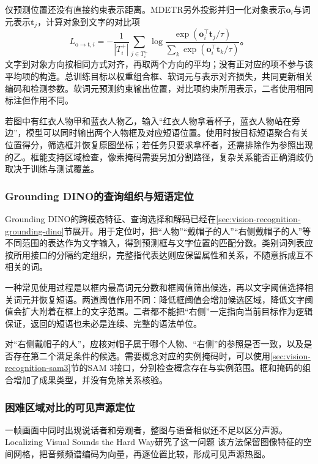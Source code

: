 仅预测位置还没有直接约束表示距离。MDETR另外投影并归一化对象表示$\bm o_i$与词元表示$\bm t_j$，计算对象到文字的对比项
\[
  L_{\mathrm{o\to t},i}
  =-\frac{1}{|T_i^+|}\sum_{j\in T_i^+}
    \log\frac{\exp(\bm o_i^\top\bm t_j/\tau)}
    {\sum_k\exp(\bm o_i^\top\bm t_k/\tau)}\text{。}
\]
文字到对象方向按相同方式对齐，再取两个方向的平均；没有正对应的项不参与该平均项的构造。总训练目标以权重组合框、软词元与表示对齐损失，共同更新相关编码和检测参数。软词元预测约束输出位置，对比项约束所用表示，二者使用相同标注但作用不同。

若图中有红衣人物甲和蓝衣人物乙，输入“红衣人物拿着杯子，蓝衣人物站在旁边”，模型可以同时输出两个人物框及对应短语位置。使用时按目标短语聚合有关位置得分，筛选框并恢复原图坐标；若任务只要求拿杯者，还需排除作为参照出现的乙。框能支持区域检查，像素掩码需要另加分割路径，复杂关系能否正确消歧仍取决于训练与测试覆盖。

\subsubsection{Grounding DINO的查询组织与短语定位}
\label{sec:vision-understanding-grounding-dino}

Grounding DINO的跨模态特征、查询选择和解码已经在\ref{sec:vision-recognition-grounding-dino}节展开。用于定位时，把“人物”“戴帽子的人”“右侧戴帽子的人”等不同范围的表达作为文字输入，得到预测框与文字位置的匹配分数。类别词列表应按所用接口的分隔约定组织，完整指代表达则应保留属性和关系，不随意拆成互不相关的词。

一种常见使用过程是以框内最高词元分数和框阈值筛出候选，再以文字阈值选择相关词元并恢复短语。两道阈值作用不同：降低框阈值会增加候选区域，降低文字阈值会扩大附着在框上的文字范围。二者都不能把“右侧”一定指向当前目标作为逻辑保证，返回的短语也未必是连续、完整的语法单位。

对“右侧戴帽子的人”，应核对帽子属于哪个人物、“右侧”的参照是否一致，以及是否存在第二个满足条件的候选。需要概念对应的实例掩码时，可以使用\ref{sec:vision-recognition-sam3}节的SAM 3接口，分别检查概念存在与实例范围。框和掩码的组合增加了成果类型，并没有免除关系核验。

\subsubsection{困难区域对比的可见声源定位}
\label{sec:vision-understanding-sound-source}

一帧画面中同时出现说话者和旁观者，整图与语音相似还不足以区分声源。Localizing Visual Sounds the Hard Way研究了这一问题
该方法保留图像特征的空间网格，把音频频谱编码为向量，再逐位置比较，形成可见声源热图。

